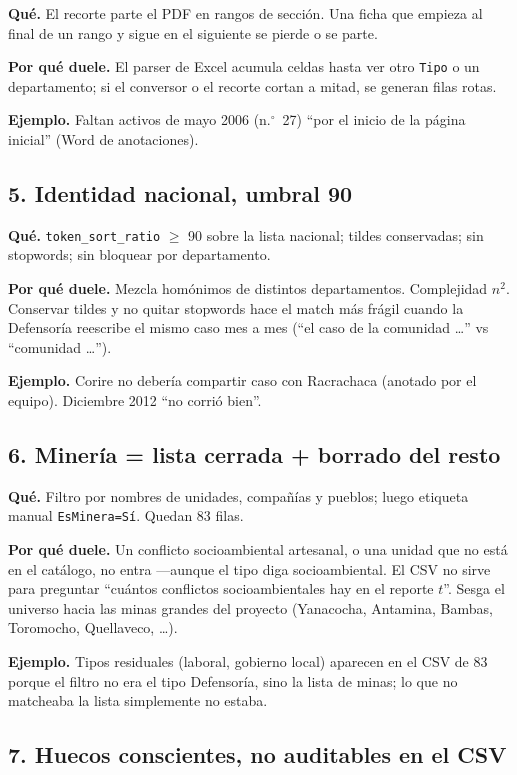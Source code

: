 \documentclass[11pt,a4paper]{article}
\begin{document}
\textbf{Qué.} El recorte parte el PDF en rangos de sección. Una ficha que empieza al final de un rango y sigue en el siguiente se pierde o se parte.

\textbf{Por qué duele.} El parser de Excel acumula celdas hasta ver otro \texttt{Tipo} o un departamento; si el conversor o el recorte cortan a mitad, se generan filas rotas.

\textbf{Ejemplo.} Faltan activos de mayo 2006 (n.$^\circ$~27) ``por el inicio de la página inicial'' (Word de anotaciones).

\subsection{5. Identidad nacional, umbral 90}

\textbf{Qué.} \texttt{token\_sort\_ratio} $\ge$ 90 sobre la lista nacional; tildes conservadas; sin stopwords; sin bloquear por departamento.

\textbf{Por qué duele.} Mezcla homónimos de distintos departamentos. Complejidad $n^2$. Conservar tildes y no quitar stopwords hace el match más frágil cuando la Defensoría reescribe el mismo caso mes a mes (``el caso de la comunidad \ldots'' vs ``comunidad \ldots'').

\textbf{Ejemplo.} Corire no debería compartir caso con Racrachaca (anotado por el equipo). Diciembre 2012 ``no corrió bien''.

\subsection{6. Minería = lista cerrada + borrado del resto}

\textbf{Qué.} Filtro por nombres de unidades, compañías y pueblos; luego etiqueta manual \texttt{EsMinera=Sí}. Quedan 83 filas.

\textbf{Por qué duele.} Un conflicto socioambiental artesanal, o una unidad que no está en el catálogo, no entra ---aunque el tipo diga socioambiental. El CSV no sirve para preguntar ``cuántos conflictos socioambientales hay en el reporte $t$''. Sesga el universo hacia las minas grandes del proyecto (Yanacocha, Antamina, Bambas, Toromocho, Quellaveco, \ldots).

\textbf{Ejemplo.} Tipos residuales (laboral, gobierno local) aparecen en el CSV de 83 porque el filtro no era el tipo Defensoría, sino la lista de minas; lo que no matcheaba la lista simplemente no estaba.

\subsection{7. Huecos conscientes, no auditables en el CSV}
\end{document}
